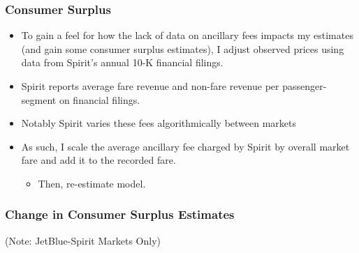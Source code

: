 \documentclass[xcolor=dvipsnames]{beamer}
\begin{document}
    \begin{frame}
        \frametitle{Consumer Surplus}
        \begin{itemize}
            \item To gain a feel for how the lack of data on ancillary fees impacts my estimates (and gain some consumer surplus estimates), I adjust observed prices using data from Spirit's annual 10-K financial filings.
            \item Spirit reports average fare revenue and non-fare revenue per passenger-segment on financial filings.
            \item Notably Spirit varies these fees  algorithmically between markets
            \item As such, I scale the average ancillary fee charged by Spirit by overall market fare and add it to the recorded fare.
            \begin{itemize}
                \item Then, re-estimate model.
            \end{itemize}
        \end{itemize}
    \end{frame}

    \begin{frame}
        \frametitle{Change in Consumer Surplus Estimates}
        \tiny
        \centering
{}

    (Note: JetBlue-Spirit Markets Only)
    \end{frame}
\end{document}
